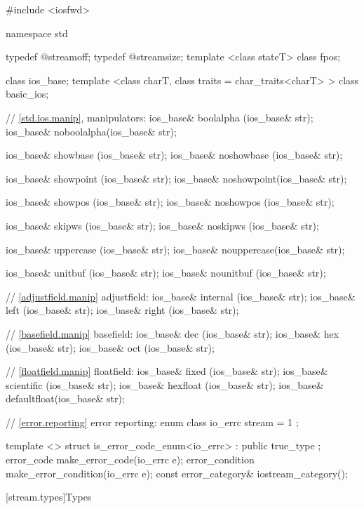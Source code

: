 \begin{codeblock}
#include <iosfwd>

namespace std {
  typedef @\impdef@ streamoff;
  typedef @\impdef@ streamsize;
  template <class stateT> class fpos;

  class ios_base;
  template <class charT, class traits = char_traits<charT> >
    class basic_ios;

  // \ref{std.ios.manip}, manipulators:
  ios_base& boolalpha  (ios_base& str);
  ios_base& noboolalpha(ios_base& str);

  ios_base& showbase   (ios_base& str);
  ios_base& noshowbase (ios_base& str);

  ios_base& showpoint  (ios_base& str);
  ios_base& noshowpoint(ios_base& str);

  ios_base& showpos    (ios_base& str);
  ios_base& noshowpos  (ios_base& str);

  ios_base& skipws     (ios_base& str);
  ios_base& noskipws   (ios_base& str);

  ios_base& uppercase  (ios_base& str);
  ios_base& nouppercase(ios_base& str);

  ios_base& unitbuf    (ios_base& str);
  ios_base& nounitbuf  (ios_base& str);

  // \ref{adjustfield.manip} adjustfield:
  ios_base& internal   (ios_base& str);
  ios_base& left       (ios_base& str);
  ios_base& right      (ios_base& str);

  // \ref{basefield.manip} basefield:
  ios_base& dec        (ios_base& str);
  ios_base& hex        (ios_base& str);
  ios_base& oct        (ios_base& str);

  // \ref{floatfield.manip} floatfield:
  ios_base& fixed      (ios_base& str);
  ios_base& scientific (ios_base& str);
  ios_base& hexfloat   (ios_base& str);
  ios_base& defaultfloat(ios_base& str);

  // \ref{error.reporting} error reporting:
  enum class io_errc {
    stream = 1
  };

  template <> struct is_error_code_enum<io_errc> : public true_type { };
  error_code make_error_code(io_errc e);
  error_condition make_error_condition(io_errc e);
  const error_category& iostream_category();
}
\end{codeblock}
%
%
%
%
%

[stream.types]{Types}

